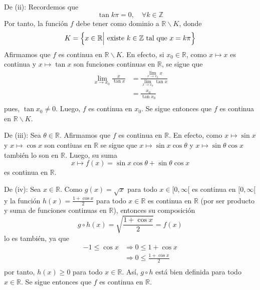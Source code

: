 \documentclass[12pt]{article}
\begin{document}
\begin{enumerate}
\begin{sol}
        De (ii): Recordemos que
        \begin{equation*}
            \tan k\pi=0,\quad\forall k\in\mathbb{Z}
        \end{equation*}
        Por tanto, la función $f$ debe tener como dominio a $\mathbb{R}\backslash K$, donde
        \begin{equation*}
            K=\left\{x\in\mathbb{R}\Big|\textup{ existe }k\in\mathbb{Z}\textup{ tal que }x=k\pi \right\}
        \end{equation*}
        Afirmamos que $f$ es continua en $\mathbb{R}\backslash K$. En efecto, si $x_0\in\mathbb{R}$, como $x\mapsto x$ es continua y $x\mapsto \tan x$ son funciones continuas en $\mathbb{R}$, se sigue que
        \begin{equation*}
            \begin{split}
                \lim_{ x\rightarrow x_0}\frac{x}{\tan x}&=\frac{\lim_{ x\rightarrow x_0}x}{\lim_{ x\rightarrow x_0}\tan x}\\
                &=\frac{x_0}{\tan x_0}\\
            \end{split}
        \end{equation*}
        pues, $\tan x_0\neq 0$. Luego, $f$ es continua en $x_0$. Se sigue entonces que $f$ es continua en $\mathbb{R}\backslash K$.
        
        De (iii): Sea $\theta\in\mathbb{R}$. Afirmamos que $f$ es continua en $\mathbb{R}$. En efecto, como $x\mapsto \sin x$ y $x\mapsto \cos x$ son contiuas en $\mathbb{R}$ se sigue que $x\mapsto \sin x\cos\theta$ y $x\mapsto \sin\theta\cos x$ también lo son en $\mathbb{R}$. Luego, su suma
        \begin{equation*}
            x\mapsto f(x)=\sin x\cos\theta+\sin\theta\cos x
        \end{equation*}
        es continua en $\mathbb{R}$.

        De (iv): Sea $x\in\mathbb{R}$. Como $g(x)=\sqrt{x}$ para todo $x\in[0,\infty[$ es continua en $[0,\infty[$ y la función $h(x)=\frac{1+\cos x}{2}$ para todo $x\in\mathbb{R}$ es continua en $\mathbb{R}$ (por ser producto y suma de funciones continuas en $\mathbb{R}$), entonces su composición
        \begin{equation*}
            g\circ h(x)=\sqrt{\frac{1+\cos x}{2}}=f(x)
        \end{equation*}
        lo es también, ya que
        \begin{equation*}
            \begin{split}
                -1\leq \cos x&\Rightarrow0\leq 1+\cos x\\
                &\Rightarrow0\leq \frac{1+\cos x}{2} \\
            \end{split}
        \end{equation*}
        por tanto, $h(x)\geq 0$ para todo $x\in\mathbb{R}$. Así, $g\circ h$ está bien definida para todo $x\in\mathbb{R}$. Se sigue entonces que $f$ es continua en $\mathbb{R}$.
    \end{sol}

\end{enumerate}
\end{document}
